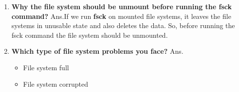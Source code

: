 \begin{enumerate}
\begin{enumerate}
  \bigskip
  \bigskip

  \item \textbf{Why the file system should be unmount before running the fsck command?}
  \newline
  Ans.If we run \textbf{fsck }on mounted file systems, it leaves the file systems in unusable state and also deletes the data. 	So, before running the fsck command the file system should be unmounted.
  

  \bigskip
  \bigskip

  \item \textbf{Which type of file system problems you face?}
  \newline
  Ans.\begin{itemize}
         \item File system full
         \item File system corrupted
      \end{itemize} 
    
\end{enumerate}
      


   
   
   

  


        

  
  


          
    
        


    


    
    
    



        
          
  
    






    

           
       
     
    

                    
                         
    








        
        









\end{enumerate}
